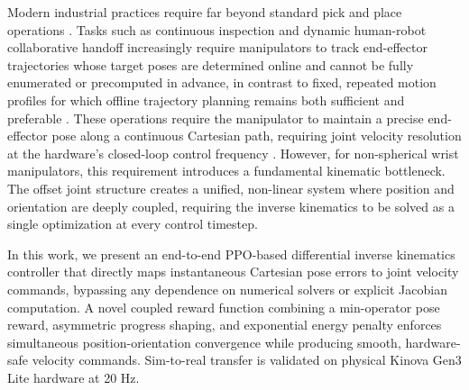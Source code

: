 \documentclass[preprint,12pt]{elsarticle}
\begin{document}
Modern industrial practices require far beyond standard pick and place operations \cite{intro_4}. Tasks such as continuous inspection and dynamic human-robot collaborative handoff increasingly require manipulators to track end-effector trajectories whose target poses are determined online and cannot be fully enumerated or precomputed in advance, in contrast to fixed, repeated motion profiles for which offline trajectory planning remains both sufficient and preferable \cite{11358968}. These operations require the manipulator to maintain a precise end-effector pose along a continuous Cartesian path, requiring joint velocity resolution at the hardware's closed-loop control frequency \cite{intro_6, intro_7}. However, for non-spherical wrist manipulators, this requirement introduces a fundamental kinematic bottleneck. The offset joint structure creates a unified, non-linear system where position and orientation are deeply coupled, requiring the inverse kinematics to be solved as a single optimization at every control timestep.

In this work, we present an end-to-end PPO-based differential inverse kinematics controller that directly maps instantaneous Cartesian pose errors to joint velocity commands, bypassing any dependence on numerical solvers or explicit Jacobian computation. A novel coupled reward function combining a min-operator pose reward, asymmetric progress shaping, and exponential energy penalty enforces simultaneous position-orientation convergence while producing smooth, hardware-safe velocity commands. Sim-to-real transfer is validated on physical Kinova Gen3 Lite hardware at 20 Hz.
\end{document}
